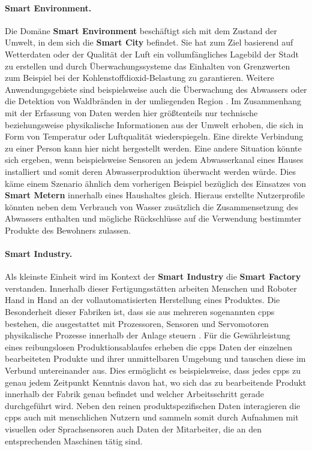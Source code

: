 \paragraph{Smart Environment.}
\label{sec:Analyse der Datenerhebung:ssec:Smart City:para:Smart Environment}
Die Domäne \textbf{Smart Environment} beschäftigt sich mit dem Zustand der Umwelt, in dem sich die \textbf{Smart City} befindet. Sie hat zum Ziel basierend auf Wetterdaten oder der Qualität der Luft ein vollumfängliches Lagebild der Stadt zu erstellen und durch Überwachungssysteme das Einhalten von Grenzwerten zum Beispiel bei der Kohlenstoffdioxid-Belastung zu garantieren. Weitere Anwendungsgebiete sind beispielsweise auch die Überwachung des Abwassers oder die Detektion von Waldbränden in der umliegenden Region \cite{SecPrivSmartCity2021}. Im Zusammenhang mit der Erfassung von Daten werden hier größtenteils nur technische beziehungsweise physikalische Informationen aus der Umwelt erhoben, die sich in Form von Temperatur oder Luftqualität wiederspiegeln. Eine direkte Verbindung zu einer Person kann hier nicht hergestellt werden. Eine andere Situation könnte sich ergeben, wenn beispielsweise Sensoren an jedem Abwasserkanal eines Hauses installiert und somit deren Abwasserproduktion überwacht werden würde. Dies käme einem Szenario ähnlich dem vorherigen Beispiel bezüglich des Einsatzes von \textbf{Smart Metern} innerhalb eines Haushaltes gleich. Hieraus erstellte Nutzerprofile könnten neben dem Verbrauch von Wasser zusätzlich die Zusammensetzung des Abwassers enthalten und mögliche Rückschlüsse auf die Verwendung bestimmter Produkte des Bewohners zulassen.\\
\paragraph{Smart Industry.}
\label{sec:Analyse der Datenerhebung:ssec:Smart City:para:Smart Industry}
Als kleinste Einheit wird im Kontext der \textbf{Smart Industry} die \textbf{Smart Factory} verstanden. Innerhalb dieser Fertigungsstätten arbeiten Menschen und Roboter Hand in Hand an der vollautomatisierten Herstellung eines Produktes. Die Besonderheit dieser Fabriken ist, dass sie aus mehreren sogenannten \ac{cpps} bestehen, die ausgestattet mit Prozessoren, Sensoren und Servomotoren physikalische Prozesse innerhalb der Anlage steuern \cite{Sadeghi2015}. Für die Gewährleistung eines reibungslosen Produktionsablaufes erheben die \ac{cpps} Daten der einzelnen bearbeiteten Produkte und ihrer unmittelbaren Umgebung und tauschen diese im Verbund untereinander aus. Dies ermöglicht es beispielsweise, dass jedes \ac{cpps} zu genau jedem Zeitpunkt Kenntnis davon hat, wo sich das zu bearbeitende Produkt innerhalb der Fabrik genau befindet und welcher Arbeitsschritt gerade durchgeführt wird. Neben den reinen produktspezifischen Daten interagieren die \ac{cpps} auch mit menschlichen Nutzern und sammeln somit durch Aufnahmen mit visuellen oder Sprachsensoren auch Daten der Mitarbeiter, die an den entsprechenden Maschinen tätig sind.\\
